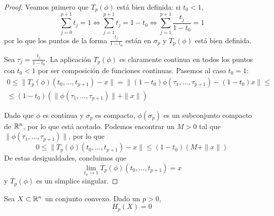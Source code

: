 \begin{proof}
Veamos primero que $T_p(\phi)$ está bien definida: si $t_0 < 1$,
\begin{equation}\label{BienDef}
\sum^{p+1}_{j=0}t_j=
1 \iff \sum^{p+1}_{j=1}t_j=
1-t_0 \iff \sum^{p+1}_{j=1}\frac{t_j}{1-t_0}=1
\end{equation}
por lo que los puntos de la forma $\frac{t_j}{1-t_0}$ están en $\sigma_p$ y
$T_p(\phi)$ está bien definida.

Sea $\tau_j=\frac{t_j}{1-t_0}$. La aplicación $T_p(\phi)$ es claramente continua
en todos los puntos con $t_0 < 1$ por ser composición de funciones continuas.
Pasemos al caso $t_0=1$:
\begin{multline*}
0	\leq \|T_p(\phi)(t_0,\dots,t_{p+1})-x\|=
\|(1-t_0)\phi(\tau_1,\dots,\tau_{p+1})-(1-t_0)x\|\leq\\
	\leq (1-t_0)(\|\phi(\tau_1,\dots,\tau_{p+1})\|+\|x\|)
\end{multline*}

Dado que $\phi$ es continua y $\sigma_p$ es compacto, $\phi(\sigma_p)$ es un
subconjunto compacto de $\mathbb{R}^n$, por lo que está acotado. Podemos encontrar un
$M > 0$ tal que $\|\phi(\tau_1,\dots,\tau_{p+1})\|$, por lo que
\[0 \leq \|T_p(\phi)(t_0,\dots,t_{p+1})-x\| \leq (1-t_0)(M+\|x\|)\]
De estas desigualdades, concluimos que
\[\lim_{t_0 \to 1}T_p(\phi)(t_0,\dots,t_{p+1})=x\]
y $T_p(\phi)$ es un símplice singular.
\end{proof}

\begin{theorem}
Sea $X \subset \mathbb{R}^n$ un conjunto convexo. Dado un $p > 0$,
\[H_p(X)=0\]
\end{theorem}

